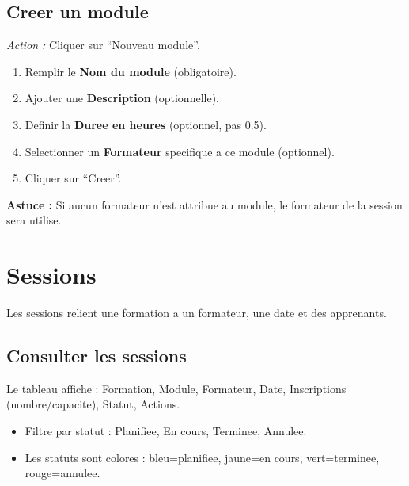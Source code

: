 \documentclass[a4paper,11pt]{article}
\newcommand{\etape}[1]{\textcolor{step}{\textbf{\'Etape :} #1}}
\newcommand{\astuce}[1]{\textcolor{tip}{\textbf{Astuce :} #1}}
\newcommand{\action}[1]{\textcolor{brand}{\textit{Action :} #1}}
\begin{document}
\subsection{Creer un module}
\action{Cliquer sur ``Nouveau module''.}
\begin{enumerate}[label=\etape{\arabic*}]
  \item Remplir le \textbf{Nom du module} (obligatoire).
  \item Ajouter une \textbf{Description} (optionnelle).
  \item Definir la \textbf{Duree en heures} (optionnel, pas 0.5).
  \item Selectionner un \textbf{Formateur} specifique a ce module (optionnel).
  \item Cliquer sur ``Creer''.
\end{enumerate}

\astuce{Si aucun formateur n'est attribue au module, le formateur de la session sera utilise.}


\section{Sessions}

Les sessions relient une formation a un formateur, une date et des apprenants.

\subsection{Consulter les sessions}
Le tableau affiche : Formation, Module, Formateur, Date, Inscriptions (nombre/capacite), Statut, Actions.
\begin{itemize}
  \item Filtre par statut : Planifiee, En cours, Terminee, Annulee.
  \item Les statuts sont colores : bleu=planifiee, jaune=en cours, vert=terminee, rouge=annulee.
\end{itemize}
\end{document}
